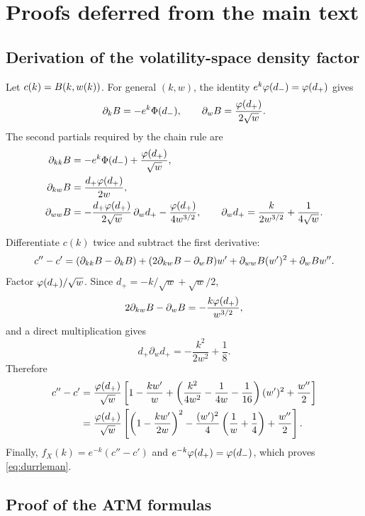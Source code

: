 \section{Proofs deferred from the main text}
\label{app:proofs}

\subsection{Derivation of the volatility-space density factor}
\label{app:durrlemanproof}

Let $c(k)=B(k,w(k))$.  For general $(k,w)$, the identity
$e^k\varphi(d_-)=\varphi(d_+)$ gives
\[
\partial_kB=-e^k\Phi(d_-),\qquad
\partial_wB=\frac{\varphi(d_+)}{2\sqrt w}.
\]
The second partials required by the chain rule are
\begin{align*}
\partial_{kk}B
&=-e^k\Phi(d_-)+\frac{\varphi(d_+)}{\sqrt w},\\
\partial_{kw}B
&=\frac{d_+\varphi(d_+)}{2w},\\
\partial_{ww}B
&=-\frac{d_+\varphi(d_+)}{2\sqrt w}\,\partial_wd_+
-\frac{\varphi(d_+)}{4w^{3/2}},
\qquad
\partial_wd_+=\frac{k}{2w^{3/2}}+\frac1{4\sqrt w}.
\end{align*}

Differentiate $c(k)$ twice and subtract the first derivative:
\[
c''-c'=(\partial_{kk}B-\partial_kB)
+(2\partial_{kw}B-\partial_wB)w'
+\partial_{ww}B(w')^2+\partial_wB w''.
\]
Factor $\varphi(d_+)/\sqrt w$.  Since
$d_+=-k/\sqrt w+\sqrt w/2$,
\[
2\partial_{kw}B-\partial_wB
=-\frac{k\varphi(d_+)}{w^{3/2}},
\]
and a direct multiplication gives
\[
d_+\partial_wd_+=-\frac{k^2}{2w^2}+\frac18.
\]
Therefore
\begin{align*}
c''-c'
&=\frac{\varphi(d_+)}{\sqrt w}
\left[1-\frac{kw'}w
+\left(\frac{k^2}{4w^2}-\frac1{4w}-\frac1{16}\right)(w')^2
+\frac{w''}{2}\right]\\
&=\frac{\varphi(d_+)}{\sqrt w}
\left[\left(1-\frac{kw'}{2w}\right)^2
-\frac{(w')^2}{4}\left(\frac1w+\frac14\right)+\frac{w''}{2}\right].
\end{align*}
Finally, $f_X(k)=e^{-k}(c''-c')$ and
$e^{-k}\varphi(d_+)=\varphi(d_-)$, which proves \eqref{eq:durrleman}.

\subsection{Proof of the ATM formulas}
\label{app:atmproof}

